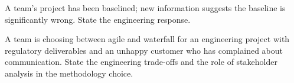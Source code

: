\begin{exercise}
A team's project has been baselined; new information suggests the baseline is significantly wrong. State the engineering response.
\end{exercise}

\begin{exercise}
A team is choosing between agile and waterfall for an engineering project with regulatory deliverables and an unhappy customer who has complained about communication. State the engineering trade-offs and the role of stakeholder analysis in the methodology choice.
\end{exercise}
